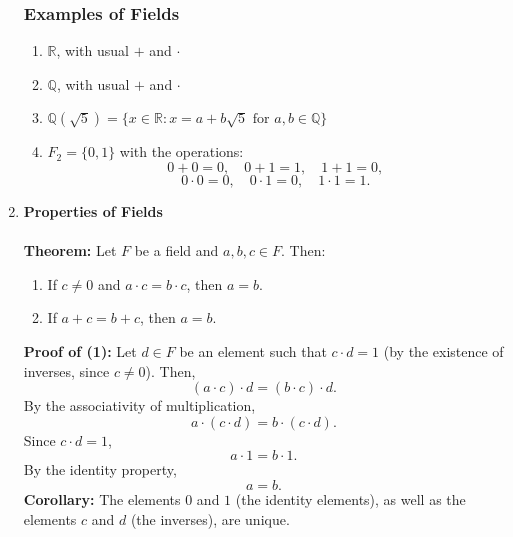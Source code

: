 \begin{enumerate}
        \subsubsection*{Examples of Fields}
            \begin{enumerate}
                \item $\mathbb{R}$, with usual $+$ and $\cdot$
                \item $\mathbb{Q}$, with usual $+$ and $\cdot$
                \item $\mathbb{Q}(\sqrt{5}) = \{x \in \mathbb{R} : x = a + b\sqrt{5} \text{ for } a, b \in \mathbb{Q} \}$
                \item $F_2 = \{0, 1\}$ with the operations:
                    \[0 + 0 = 0, \quad 0 + 1 = 1, \quad 1 + 1 = 0,\]
                    \[0 \cdot 0 = 0, \quad 0 \cdot 1 = 0, \quad 1 \cdot 1 = 1.\]
            \end{enumerate}

    \item \textbf{Properties of Fields}\\ \\
        \textbf{Theorem:} Let $F$ be a field and $a, b, c \in F$. Then:
        \begin{enumerate}
            \item If $c \neq 0$ and $a \cdot c = b \cdot c$, then $a = b$.
            \item If $a + c = b + c$, then $a = b$.
        \end{enumerate}

        \textbf{Proof of (1):} Let $d \in F$ be an element such that $c \cdot d = 1$ (by the existence of inverses, since $c \neq 0$). Then,
        \[
            (a \cdot c) \cdot d = (b \cdot c) \cdot d.
        \]
        By the associativity of multiplication,
        \[
            a \cdot (c \cdot d) = b \cdot (c \cdot d).
        \]
        Since $c \cdot d = 1$,
        \[
            a \cdot 1 = b \cdot 1.
        \]
        By the identity property,
        \[
            a = b.
        \]
        \textbf{Corollary:} The elements $0$ and $1$ (the identity elements), as well as the elements $c$ and $d$ (the inverses), are unique.
    \end{enumerate}

